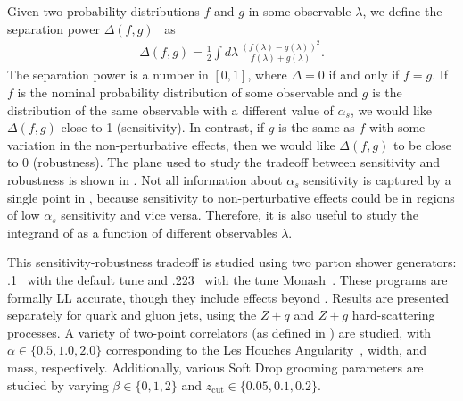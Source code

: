 Given two probability distributions $f$ and $g$ in some observable $\lambda$, we define the separation power $\Delta(f,g)$~\cite{Harrison:1998yr} as
%
\begin{align}
\label{eq:seppower}
\Delta(f,g)=\frac{1}{2}\int d\lambda \, \frac{(f(\lambda)-g(\lambda))^2}{f(\lambda)+g(\lambda)}.
\end{align}
%
The separation power is a number in $[0,1]$, where $\Delta=0$ if and only if $f=g$.
%
If $f$ is the nominal probability distribution of some observable and $g$ is the distribution of the same observable with a different value of $\alpha_s$, we would like $\Delta(f,g)$ close to 1 (sensitivity).
%
In contrast, if $g$ is the same as $f$ with some variation in the non-perturbative effects, then we would like $\Delta(f,g)$ to be close to $0$ (robustness).
%
The plane used to study the tradeoff between sensitivity and robustness is shown in .
%
Not all information about $\alpha_s$ sensitivity is captured by a single point in , because sensitivity to non-perturbative effects could be in regions of low $\alpha_s$ sensitivity and vice versa.
%
Therefore, it is also useful to study the integrand of  as a function of different observables $\lambda$.


This sensitivity-robustness tradeoff is studied using two parton shower generators: \herwig.1~\cite{Bellm:2015jjp,Reichelt:2017hts} with the default tune and \pythia.223~\cite{Sjostrand:2006za,Sjostrand:2014zea} with the tune Monash~\cite{Skands:2014pea}.
%
These programs are formally LL accurate, though they include effects beyond .
%
Results are presented separately for quark and gluon jets, using the $Z+q$ and $Z+g$ hard-scattering processes.
%
A variety of two-point correlators (as defined in ) are studied, with $\alpha\in\{0.5,1.0, 2.0\}$ corresponding to the Les Houches Angularity~\cite{Gras:2017jty}, width, and mass, respectively. 
%
Additionally, various Soft Drop grooming parameters are studied by varying $\beta\in\{0,1,2\}$ and $z_\text{cut}\in \{0.05,0.1,0.2\}$.  

